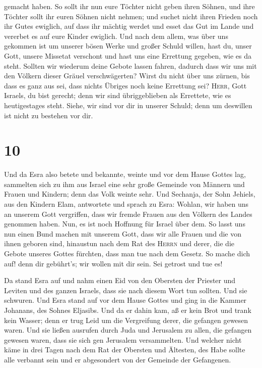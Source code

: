 gemacht haben.  So sollt ihr nun eure Töchter nicht geben
ihren Söhnen, und ihre Töchter sollt ihr euren Söhnen nicht nehmen; und
suchet nicht ihren Frieden noch ihr Gutes ewiglich, auf dass ihr mächtig
werdet und esset das Gut im Lande und vererbet es auf eure Kinder
ewiglich.  Und nach dem allem, was über uns gekommen ist
um unserer bösen Werke und großer Schuld willen, hast du, unser Gott,
unsere Missetat verschont und hast uns eine Errettung gegeben, wie es da
steht.  Sollten wir wiederum deine Gebote lassen fahren,
dadurch dass wir uns mit den Völkern dieser Gräuel verschwägerten? Wirst
du nicht über uns zürnen, bis dass es ganz aus sei, dass nichts Übriges
noch keine Errettung sei?  \textsc{Herr}, Gott Israels,
du bist gerecht; denn wir sind übriggeblieben als Errettete, wie es
heutigestages steht. Siehe, wir sind vor dir in unserer Schuld; denn um
deswillen ist nicht zu bestehen vor dir.

\hypertarget{section-9}{%
\section{10}\label{section-9}}

 Und da Esra also betete und bekannte, weinte und vor dem
Hause Gottes lag, sammelten sich zu ihm aus Israel eine sehr große
Gemeinde von Männern und Frauen und Kindern; denn das Volk weinte sehr.
 Und Sechanja, der Sohn Jehiels, aus den Kindern Elam,
antwortete und sprach zu Esra: Wohlan, wir haben uns an unserem Gott
vergriffen, dass wir fremde Frauen aus den Völkern des Landes genommen
haben. Nun, es ist noch Hoffnung für Israel über dem.  So
lasst uns nun einen Bund machen mit unserem Gott, dass wir alle Frauen
und die von ihnen geboren sind, hinaustun nach dem Rat des
\textsc{Herrn} und derer, die die Gebote unseres Gottes fürchten, dass
man tue nach dem Gesetz.  So mache dich auf! denn dir
gebührt's; wir wollen mit dir sein. Sei getrost und tue es!

 Da stand Esra auf und nahm einen Eid von den Obersten der
Priester und Leviten und des ganzen Israels, dass sie nach diesem Wort
tun sollten. Und sie schwuren.  Und Esra stand auf vor dem
Hause Gottes und ging in die Kammer Johanans, des Sohnes Eljasibs. Und
da er dahin kam, aß er kein Brot und trank kein Wasser; denn er trug
Leid um die Vergreifung derer, die gefangen gewesen waren.
 Und sie ließen ausrufen durch Juda und Jerusalem zu
allen, die gefangen gewesen waren, dass sie sich gen Jerusalem
versammelten.  Und welcher nicht käme in drei Tagen nach
dem Rat der Obersten und Ältesten, des Habe sollte alle verbannt sein
und er abgesondert von der Gemeinde der Gefangenen.


